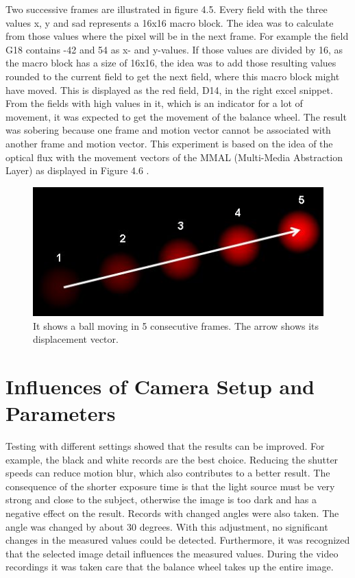 \documentclass[12pt, a4paper]{report}
\begin{document}
    Two successive frames are illustrated in figure 4.5. Every field with the three values x, y and sad represents a 16x16 macro block. The idea was to calculate from those values where the pixel will be in the next frame. For example the field G18 contains -42 and 54 as x- and y-values. If those values are divided by 16, as the macro block has a size of 16x16, the idea was to add those resulting values rounded to the current field to get the next field, where this macro block might have moved. This is displayed as the red field, D14, in the right excel snippet. From the fields with high values in it, which is an indicator for a lot of movement, it was expected to get the movement of the balance wheel. 
    The result was sobering because one frame and motion vector cannot be associated with another frame and motion vector.
    This experiment is based on the idea of the optical flux with the movement vectors of the MMAL (Multi-Media Abstraction Layer) as displayed in Figure 4.6 .
    
    \noindent
    \begin{figure}[H]
    \centering
    \includegraphics[scale=0.7]{Images/optical_flow_basic1.jpg}
    
    \caption{It shows a ball moving in 5 consecutive frames. The arrow shows its displacement vector.}
    \end{figure}
    
    \section{Influences of Camera Setup and Parameters}
    Testing with different settings showed that the results can be improved. For example, the black and white records are the best choice. Reducing the shutter speeds can reduce motion blur, which also contributes to a better result.
    The consequence of the shorter exposure time is that the light source must be very strong and close to the subject, otherwise the image is too dark and has a negative effect on the result.
    Records with changed angles were also taken. The angle was changed by about 30 degrees. With this adjustment, no significant changes in the measured values could be detected.
    Furthermore, it was recognized that the selected image detail influences the measured values. During the video recordings it was taken care that the balance wheel takes up the entire image.
    \newpage
    
\end{document}
